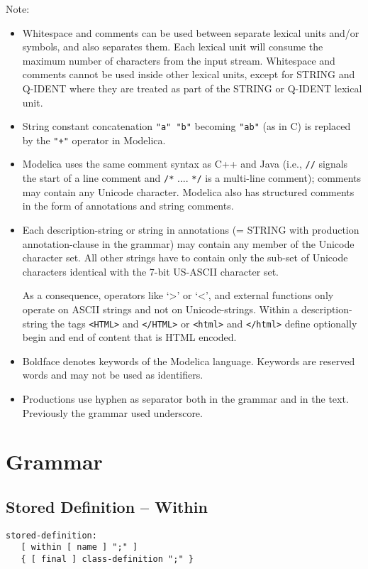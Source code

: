 Note:
\begin{itemize}
\item
  Whitespace and comments can be used between separate lexical units
  and/or symbols, and also separates them. Each lexical unit will consume the maximum number of characters from the input stream.
  Whitespace and comments
  cannot be used inside other lexical units, except for STRING and
  Q-IDENT where they are treated as part of the STRING or Q-IDENT
  lexical unit.
\item
  String constant concatenation \lstinline!"a" "b"! becoming \lstinline!"ab"! (as in C) is
  replaced by the \lstinline!"+"! operator in Modelica.
\item
  Modelica uses the same comment syntax as C++ and Java (i.e., \lstinline!//!
  signals the start of a line comment and \lstinline!/*! .... \lstinline!*/! is a multi-line
  comment); comments may contain any Unicode character. Modelica also
  has structured comments in the form of annotations and string
  comments.
\item
  Each description-string or string in annotations (= STRING with production annotation-clause in the
  grammar) may contain any member of the Unicode character set. All
  other strings have to contain only the sub-set of Unicode characters
  identical with the 7-bit US-ASCII character set.
  \begin{nonnormative}
  As a consequence, operators like `\textgreater{}' or `\textless{}', and external functions only operate on ASCII strings and not on Unicode-strings.
  Within a description-string the tags \lstinline!<HTML>! and \lstinline!</HTML>! or \lstinline!<html>! and \lstinline!</html>! define optionally begin
  and end of content that is HTML encoded.
  \end{nonnormative}
\item
  Boldface denotes keywords of the Modelica language. Keywords are
  reserved words and may not be used as identifiers.
\item
  Productions use hyphen as separator both in the grammar and in the
  text. Previously the grammar used underscore.
\end{itemize}

\section{Grammar}
\subsection{Stored Definition -- Within}
\begin{lstlisting}[language=grammar]
stored-definition:
   [ within [ name ] ";" ]
   { [ final ] class-definition ";" }
\end{lstlisting}

